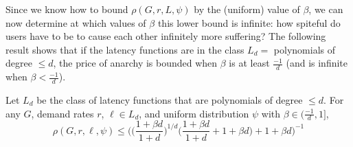 Since we know how to bound $\rho(G,r,{L},\psi)$ by the (uniform) value of $\beta$, we can now determine at which values of $\beta$ this lower bound is infinite: how spiteful do users have to be to cause each other infinitely more suffering? The following result shows that if the latency functions are in the class $L_d =$ polynomials of degree $\le d$, the price of anarchy is bounded when $\beta$ is at least $\frac{-1}{d}$ (and is infinite when $\beta < \frac{-1}d$).
\begin{theorem}
    Let $L_d$ be the class of latency functions that are polynomials of degree $\le d$.
    For any $G$, demand rates $r$, $\ell \in L_d$, and uniform distribution $\psi$ with $\beta \in (\frac{-1}{d}, 1]$,
    $$\rho(G,r,\ell,\psi) \le \Big(\Big(\frac{1+\beta d}{1+d}\Big)^{1/d}\Big(\frac{1+\beta d}{1+d} + 1 + \beta d\Big)+ 1 + \beta d\Big)^{-1}$$
\end{theorem}
